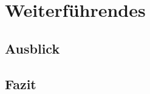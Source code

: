 \documentclass[ngerman]{report}
\begin{document}
    \chapter{Weiterführendes}  %
    \section{Ausblick}
    
    \section{Fazit}
    

    \printbibliography
\end{document}
